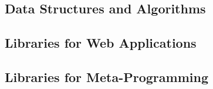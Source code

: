 \documentclass[11pt,fleqn]{article}
\begin{document}
{\subsection{Data Structures and Algorithms}












\subsection{Libraries for Web Applications}











\subsection{Libraries for Meta-Programming}














} %

\newpage



\newpage
\end{document}
